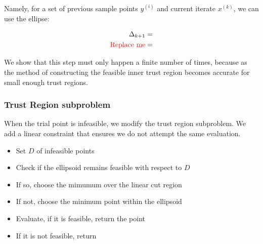 \documentclass{article}
\theoremstyle{case}
\newcommand{\iteratek}{{x}^{(k)}}
\newcommand{\innertrk}{\color{red} \text{Replace me} \color{black} }
\begin{document}
Namely, for a set of previous sample points $y^{(i)}$ and current iterate $\iteratek$, we can use the ellipse:

\begin{align*}
\Delta_{k+1} = \\
\innertrk = 
\end{align*}


We show that this step must only happen a finite number of times, because as the method of constructing the feasible inner trust region becomes accurate for small enough trust regions.


\subsubsection{Trust Region subproblem}

When the trial point is infeasible, we modify the trust region subproblem.
We add a linear constraint that ensures we do not attempt the same evaluation.





\color{red}
\begin{itemize}
\item Set $D$ of infeasible points
\item Check if the ellipsoid remains feasible with respect to $D$
\item If so, choose the mimumum over the linear cut region
\item If not, choose the minimum point within the ellipsoid
\item Evaluate, if it is feasible, return the point
\item If it is not feasible, return 
\end{itemize}
\end{document}
